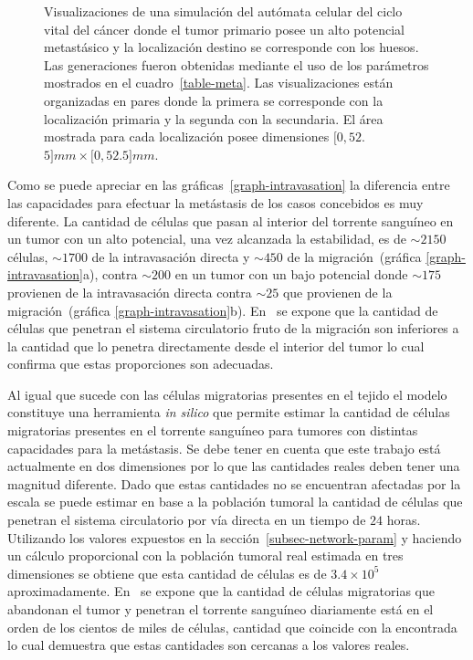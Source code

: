 \begin{figure}[p]
\begin{center}
\end{center}\vspace*{-0.6cm}
\caption[Visualizaciones de una simulaci\'on del aut\'omata celular del ciclo vital del c\'ancer donde el tumor primario posee un alto potencial metast\'asico]{Visualizaciones de una simulaci\'on del aut\'omata celular del ciclo vital del c\'ancer donde el tumor primario posee un alto potencial metast\'asico y la localizaci\'on destino se corresponde con los huesos. Las generaciones fueron obtenidas mediante el uso de los par\'ametros mostrados en el cuadro~\ref{table-meta}. Las visualizaciones est\'an organizadas en pares donde la primera se corresponde con la localizaci\'on primaria y la segunda con la secundaria. El \'area mostrada para cada localizaci\'on posee dimensiones $[0,52$.$5]mm \times [0,52$.$5]mm$.}
\label{fig-full-automata}
\end{figure}

Como se puede apreciar en las gr\'aficas~\ref{graph-intravasation} la diferencia entre las capacidades para efectuar la met\'astasis de los casos concebidos es muy diferente. La cantidad de c\'elulas que pasan al interior del torrente sangu\'ineo en un tumor con un alto potencial, una vez alcanzada la estabilidad, es de $\sim 2150$ c\'elulas, $\sim 1700$ de la intravasaci\'on directa y $\sim 450$ de la migraci\'on~(gr\'afica \ref{graph-intravasation}a), contra $\sim 200$ en un tumor con un bajo potencial donde $\sim 175$ provienen de la intravasaci\'on directa contra $\sim 25$ que provienen de la migraci\'on~(gr\'afica \ref{graph-intravasation}b). En~\cite{saidel} se expone que la cantidad de c\'elulas que penetran el sistema circulatorio fruto de la migraci\'on son inferiores a la cantidad que lo penetra directamente desde el interior del tumor lo cual confirma que estas proporciones son adecuadas. 

Al igual que sucede con las c\'elulas migratorias presentes en el tejido el modelo constituye una herramienta \emph{in silico} que permite estimar la cantidad de c\'elulas migratorias presentes en el torrente sangu\'ineo para tumores con distintas capacidades para la met\'astasis. Se debe tener en cuenta que este trabajo est\'a actualmente en dos dimensiones por lo que las cantidades reales deben tener una magnitud diferente. Dado que estas cantidades no se encuentran afectadas por la escala se puede estimar en base a la poblaci\'on tumoral la cantidad de c\'elulas que penetran el sistema circulatorio por v\'ia directa en un tiempo de $24$ horas. Utilizando los valores expuestos en la secci\'on~\ref{subsec-network-param} y haciendo un c\'alculo proporcional con la poblaci\'on tumoral real estimada en tres dimensiones se obtiene que esta cantidad de c\'elulas es de $3$.$4 \times 10^5$ aproximadamente. En~\cite{robins} se expone que la cantidad de c\'elulas migratorias que abandonan el tumor y penetran el torrente sangu\'ineo diariamente est\'a en el orden de los cientos de miles de c\'elulas, cantidad que coincide con la encontrada lo cual demuestra que estas cantidades son cercanas a los valores reales. 

